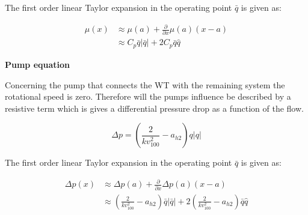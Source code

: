 The first order linear Taylor expansion in the operating point $\bar{q}$ is given as:

\begin{equation}
	\begin{split}
		\mu(x) &\approx \mu(a) + \frac{\partial}{\partial x} \mu(a) (x-a) \\
			   &\approx C_p \bar{q} |\bar{q}| + 2 C_p \bar{q} \hat{q}
	\end{split}
\end{equation}


\bigskip
\bigskip 
\textbf{Pump equation}

Concerning the pump that connects the WT with the remaining system the rotational speed is zero. Therefore will the pumps influence be described by a resistive term which is gives a differential pressure drop as a function of the flow.

\begin{equation}
	\Delta p = (\frac{2}{{kv_{100}^2}} - a_{h2}) q |q|
\end{equation}

The first order linear Taylor expansion in the operating point $\bar{q}$ is given as:

\begin{equation}
	\begin{split}
		\Delta p(x) &\approx \Delta p(a) + \frac{\partial}{\partial x} \Delta p(a) (x-a) \\
			   &\approx (\frac{2}{{kv_{100}^2}} - a_{h2}) \bar{q} |\bar{q}| + 2 (\frac{2}{{kv_{100}^2}} - a_{h2}) \bar{q} \hat{q}
	\end{split}
\end{equation}